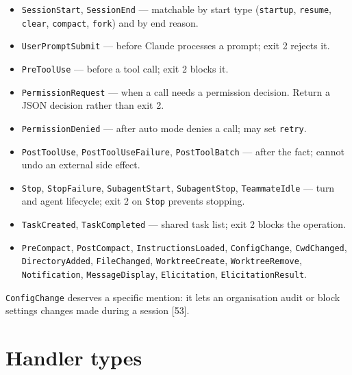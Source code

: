 \documentclass[11pt,a4paper,twoside,openany]{book}
\begin{document}
\begin{itemize}
\item \texttt{Session\allowbreak{}Start}, \texttt{Session\allowbreak{}End} — matchable by start type (\texttt{startup}, \texttt{resume}, \texttt{clear}, \texttt{compact}, \texttt{fork}) and by end reason.
\item \texttt{User\allowbreak{}Prompt\allowbreak{}Submit} — before Claude processes a prompt; exit 2 rejects it.
\item \texttt{Pre\allowbreak{}Tool\allowbreak{}Use} — before a tool call; exit 2 blocks it.
\item \texttt{Permission\allowbreak{}Request} — when a call needs a permission decision. Return a JSON decision rather than exit 2.
\item \texttt{Permission\allowbreak{}Denied} — after auto mode denies a call; may set \texttt{retry}.
\item \texttt{Post\allowbreak{}Tool\allowbreak{}Use}, \texttt{Post\allowbreak{}Tool\allowbreak{}Use\allowbreak{}Failure}, \texttt{Post\allowbreak{}Tool\allowbreak{}Batch} — after the fact; cannot undo an external side effect.
\item \texttt{Stop}, \texttt{Stop\allowbreak{}Failure}, \texttt{Subagent\allowbreak{}Start}, \texttt{Subagent\allowbreak{}Stop}, \texttt{Teammate\allowbreak{}Idle} — turn and agent lifecycle; exit 2 on \texttt{Stop} prevents stopping.
\item \texttt{Task\allowbreak{}Created}, \texttt{Task\allowbreak{}Completed} — shared task list; exit 2 blocks the operation.
\item \texttt{Pre\allowbreak{}Compact}, \texttt{Post\allowbreak{}Compact}, \texttt{Instruction\allowbreak{}s\allowbreak{}Loaded}, \texttt{Config\allowbreak{}Change}, \texttt{Cwd\allowbreak{}Changed}, \texttt{Directory\allowbreak{}Added}, \texttt{File\allowbreak{}Changed}, \texttt{Worktree\allowbreak{}Create}, \texttt{Worktree\allowbreak{}Remove}, \texttt{Notificatio\allowbreak{}n}, \texttt{Message\allowbreak{}Display}, \texttt{Elicitation}, \texttt{Elicitation\allowbreak{}Result}.
\end{itemize}

\texttt{Config\allowbreak{}Change} deserves a specific mention: it lets an organisation audit or block settings changes made during a session [53].


\FloatBarrier
\setcounter{section}{1}
\section{Handler types}
\end{document}
